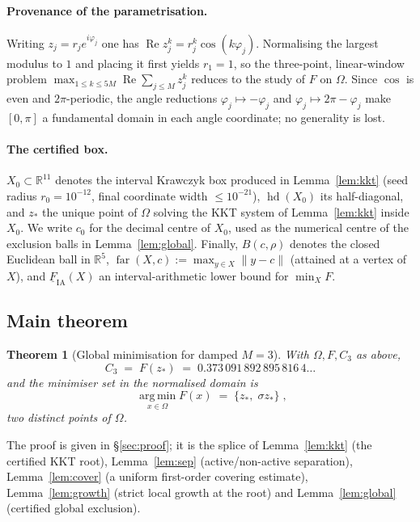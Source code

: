 \documentclass[11pt]{article}
\newtheorem{theorem}{Theorem}
\theoremstyle{remark}
\newcommand{\R}{\mathbb{R}}
\newcommand{\Om}{\Omega}
\newcommand{\hd}{\operatorname{hd}}
\newcommand{\far}{\operatorname{far}}
\begin{document}
\paragraph{Provenance of the parametrisation.}
Writing $z_j=r_je^{i\varphi_j}$ one has $\operatorname{Re}z_j^k=r_j^k\cos(k\varphi_j)$. Normalising the
largest modulus to $1$ and placing it first yields $r_1=1$, so the three-point, linear-window problem
$\max_{1\le k\le 5M}\operatorname{Re}\sum_{j\le M}z_j^k$ reduces to the study of $F$ on $\Om$. Since
$\cos$ is even and $2\pi$-periodic, the angle reductions $\varphi_j\mapsto-\varphi_j$ and
$\varphi_j\mapsto 2\pi-\varphi_j$ make $[0,\pi]$ a fundamental domain in each angle coordinate; no
generality is lost.

\paragraph{The certified box.}
$X_0\subset\R^{11}$ denotes the interval Krawczyk box produced in Lemma~\ref{lem:kkt} (seed radius
$r_0=10^{-12}$, final coordinate width $\le 10^{-21}$), $\hd(X_0)$ its half-diagonal, and $z_*$ the unique
point of $\Om$ solving the KKT system of Lemma~\ref{lem:kkt} inside $X_0$. We write $c_0$ for the decimal
centre of $X_0$, used as the numerical centre of the exclusion balls in Lemma~\ref{lem:global}. Finally,
$B(c,\rho)$ denotes the closed Euclidean ball in $\R^5$, $\far(X,c):=\max_{y\in X}\|y-c\|$ (attained at a
vertex of $X$), and $\underline F_{\mathrm{IA}}(X)$ an interval-arithmetic lower bound for $\min_X F$.

\subsection{Main theorem}

\begin{theorem}[Global minimisation for damped $M=3$]\label{thm:A}
With $\Om,F,C_3$ as above,
\[
\boxed{\;C_3 \;=\; F(z_*) \;=\; 0.373\,091\,892\,895\,816\,4\ldots\;}
\]
and the minimiser set in the normalised domain is
\[
\boxed{\;\operatorname*{arg\,min}_{x\in\Om}F(x)\;=\;\{z_*,\;\sigma z_*\}\;},
\]
two distinct points of $\Om$.
\end{theorem}

The proof is given in \S\ref{sec:proof}; it is the splice of Lemma~\ref{lem:kkt}
(the certified KKT root), Lemma~\ref{lem:sep} (active/non-active separation),
Lemma~\ref{lem:cover} (a uniform first-order covering estimate), Lemma~\ref{lem:growth}
(strict local growth at the root) and Lemma~\ref{lem:global} (certified global exclusion).
\end{document}
